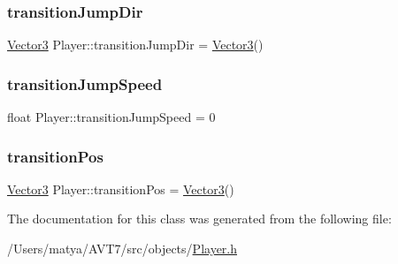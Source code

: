 \subsubsection{\texorpdfstring{transition\+Jump\+Dir}{transitionJumpDir}}
{\footnotesize\ttfamily \hyperlink{class_vector3}{Vector3} Player\+::transition\+Jump\+Dir = \hyperlink{class_vector3}{Vector3}()\hspace{0.3cm}{\ttfamily [protected]}}

\mbox{\label{class_player_af7711712d6bd0b3185f8a38f769ff3c8}} 
\subsubsection{\texorpdfstring{transition\+Jump\+Speed}{transitionJumpSpeed}}
{\footnotesize\ttfamily float Player\+::transition\+Jump\+Speed = 0\hspace{0.3cm}{\ttfamily [protected]}}

\mbox{\label{class_player_a6c51347e4c397febebd559c19d7969b9}} 
\subsubsection{\texorpdfstring{transition\+Pos}{transitionPos}}
{\footnotesize\ttfamily \hyperlink{class_vector3}{Vector3} Player\+::transition\+Pos = \hyperlink{class_vector3}{Vector3}()\hspace{0.3cm}{\ttfamily [protected]}}



The documentation for this class was generated from the following file\+:\begin{DoxyCompactItemize}
\item 
/\+Users/matya/\+A\+V\+T7/src/objects/\hyperlink{_player_8h}{Player.\+h}\end{DoxyCompactItemize}
